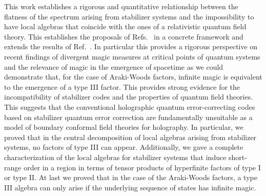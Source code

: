 \documentclass[aps,pra,reprint,superscriptaddress]{revtex4-2}
\theoremstyle{definition}
\theoremstyle{remark}
\begin{document}
This %
work
establishes a rigorous 
and quantitative relationship between the flatness of the spectrum arising from stabilizer systems and the impossibility to have local algebras
that coincide with the ones of a relativistic quantum field theory. This establishes the proposals of Refs.~\cite{Chemissany:2025vye, Benedetti:2026mfy} in a concrete framework and extends the results of Ref.~\cite{Moosa:2026nqz}.
In particular this provides a rigorous perspective on recent findings of divergent magic measures
at critical points of quantum systems
\cite{oliviero2022magicstateresourcetheory} and the relevance of magic in the emergence of spacetime \cite{cao2024gravitationalbackreactionmagical, Cao:2026uoq} as we could demonstrate that, for the case of Araki-Woods factors, infinite magic is equivalent to the emergence of a type III factor.
This provides strong evidence for the incompatibility of stabilizer codes and the properties of quantum field theories. This suggests that the conventional 
holographic quantum error-correcting codes \cite{Pastawski:2015qua} based on stabilizer quantum error correction are fundamentally unsuitable as a model of boundary conformal field theories for holography. 
In particular, we proved that in the central decomposition of local algebras arising from stabilizer systems, no factors of type III can appear. 
Additionally, we gave a complete characterization of the local algebras for
stabilizer systems that induce short-range order in a region in terms of tensor products of
hyperfinite factors of type I or type II. At last we proved that in the case of the Araki-Woods factors, a type III algebra can only arise if the underlying sequence of states has infinite magic.
\end{document}
